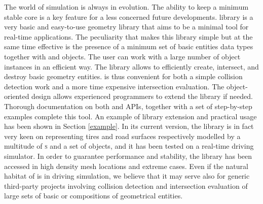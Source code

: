 The world of simulation is always in evolution. The ability to keep a minimum stable core is a key feature for a less concerned future developments. \Acme{} library is a very basic and easy-to-use \cpp{} geometry library that aims to be a minimal tool for real-time applications. The peculiarity that makes this library simple but at the same time effective is the presence of a minimum set of basic entities data types together with \AabbTree{} and \Collection{} objects. The user can work with a large number of object instances in an efficient way. The library allows to efficiently create, intersect, and destroy basic geometry entities. \Acme{} is thus convenient for both a simple collision detection work and a more time expensive intersection evaluation. The object-oriented design allows experienced programmers to extend the library if needed. Thorough documentation on both \cpp{} and \Matlab{} APIs, together with a set of step-by-step examples complete this tool. An example of library extension and practical usage has been shown in Section \ref{example}. In its current version, the library is in fact very keen on representing tires and road surfaces respectively modelled by a multitude of \Triangle{}\textsc{s} and a set of \Disk{} objects, and it has been tested on a real-time driving simulator. In order to guarantee performance and stability, the library has been accessed in high density mesh locations and extreme cases. Even if the natural habitat of \Acme{} is in driving simulation, we believe that it may serve also for generic third-party projects involving collision detection and intersection evaluation of large sets of basic or compositions of geometrical entities.



